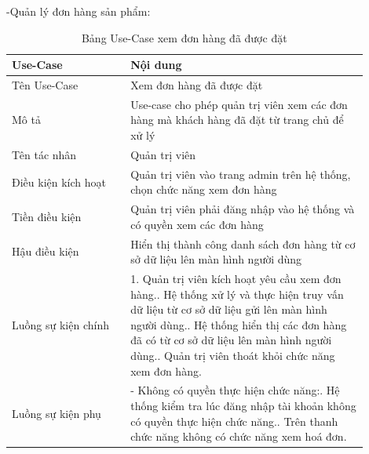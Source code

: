 -Quản lý đơn hàng sản phẩm:
\begin{longtable}[htp]{ |m{0.3\linewidth}|m{0.6\linewidth}|}
 \caption{Bảng Use-Case xem đơn hàng đã được đặt \label{listBill}}\\
 \hline
 Use-Case & Nội dung \\
 \hline
 Tên Use-Case & Xem đơn hàng đã được đặt \\
 \hline
 Mô tả & Use-case cho phép quản trị viên xem các đơn hàng mà khách hàng đã đặt từ trang chủ để xử lý\\
 \hline
 Tên tác nhân & Quản trị viên\\
 \hline
 Điều kiện kích hoạt & Quản trị viên vào trang admin trên hệ thống, chọn chức năng xem đơn hàng\\
 \hline
 Tiền điều kiện & Quản trị viên phải đăng nhập vào hệ thống và có quyền xem các đơn hàng\\
 \hline
 Hậu điều kiện & Hiển thị thành công danh sách đơn hàng từ cơ sở dữ liệu lên màn hình người dùng\\
 \hline
 Luồng sự kiện chính & 
 1. Quản trị viên kích hoạt yêu cầu xem đơn hàng.\newline
 2. Hệ thống xử lý và thực hiện truy vấn dữ liệu từ cơ sở dữ liệu gửi lên màn hình người dùng.\newline
 3. Hệ thống hiển thị các đơn hàng đã có từ cơ sở dữ liệu lên màn hình người dùng.\newline	
 4. Quản trị viên thoát khỏi chức năng xem đơn hàng.
 \\
 \hline
 Luồng sự kiện phụ & 
  - Không có quyền thực hiện chức năng:\newline
  1. Hệ thống kiểm tra lúc đăng nhập tài khoản không có quyền thực hiện chức năng.\newline
  2. Trên thanh chức năng không có chức năng xem hoá đơn.
 \\
 \hline
\end{longtable}

